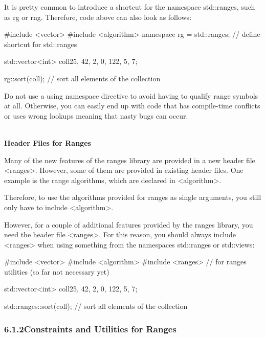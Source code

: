 It is pretty common to introduce a shortcut for the namespace std::ranges, such as rg or rng. Therefore, code above can also look as follows:

\begin{cpp}
#include <vector>
#include <algorithm>
namespace rg = std::ranges; // define shortcut for std::ranges

std::vector<int> coll{25, 42, 2, 0, 122, 5, 7};

rg::sort(coll); // sort all elements of the collection
\end{cpp}

Do not use a using namespace directive to avoid having to qualify range symbols at all. Otherwise, you can easily end up with code that has compile-time conflicts or uses wrong lookups meaning that nasty bugs can occur.

\noindent
\hspace*{\fill} \\ %
\textbf{Header Files for Ranges}

Many of the new features of the ranges library are provided in a new header file <ranges>. However, some of them are provided in existing header files. One example is the range algorithms, which are declared in <algorithm>.

Therefore, to use the algorithms provided for ranges as single arguments, you still only have to include <algorithm>.

However, for a couple of additional features provided by the ranges library, you need the header file <ranges>. For this reason, you should always include <ranges> when using something from the namespaces std::ranges or std::views:

\begin{cpp}
#include <vector>
#include <algorithm>
#include <ranges> // for ranges utilities (so far not necessary yet)

std::vector<int> coll{25, 42, 2, 0, 122, 5, 7};

std::ranges::sort(coll); // sort all elements of the collection
\end{cpp}

\subsubsection*{ 6.1.2\hspace{0.2cm}Constraints and Utilities for Ranges}

